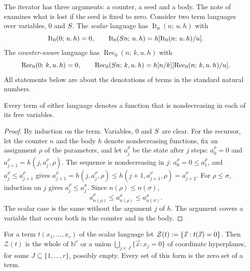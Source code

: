 The iterator has three arguments: a counter, a seed and a body.  The note of
 examines what is lost if the seed is fixed to
zero.  Consider two term languages over variables, $0$ and $S$.  The
\emph{scalar} language has $\operatorname{It}_0(n;\,u.\,h)$ with
\[
 \operatorname{It}_0(0;\,u.\,h)=0,\qquad
 \operatorname{It}_0(S n;\,u.\,h)=h[\operatorname{It}_0(n;\,u.\,h)/u].
\]
The \emph{counter-aware} language has $\operatorname{Rec}_0(n;\,k,u.\,h)$
with
\[
 \operatorname{Rec}_0(0;\,k,u.\,h)=0,\qquad
 \operatorname{Rec}_0(S n;\,k,u.\,h)
  =h[n/k][\operatorname{Rec}_0(n;\,k,u.\,h)/u].
\]
All statements below are about the denotations of terms in the standard
natural numbers.

\begin{theorem}[Monotonicity]
\label{kern:thm:mono}
Every term of either language denotes a function that is nondecreasing in
each of its free variables.
\end{theorem}

\begin{proof}
By induction on the term.  Variables, $0$ and $S$ are clear.  For the
recursor, let the counter $n$ and the body $h$ denote nondecreasing
functions, fix an assignment $\rho$ of the parameters, and let $a^{\rho}_j$
be the state after $j$ steps: $a^{\rho}_0=0$ and
$a^{\rho}_{j+1}=h(j,a^{\rho}_j,\rho)$.  The sequence is nondecreasing in
$j$: $a^{\rho}_0=0\le a^{\rho}_1$, and $a^{\rho}_j\le a^{\rho}_{j+1}$ gives
$a^{\rho}_{j+1}=h(j,a^{\rho}_j,\rho)\le h(j+1,a^{\rho}_{j+1},\rho)
=a^{\rho}_{j+2}$.  For $\rho\le\sigma$, induction on $j$ gives
$a^{\rho}_j\le a^{\sigma}_j$.  Since $n(\rho)\le n(\sigma)$,
\[
 a^{\rho}_{n(\rho)}\le a^{\sigma}_{n(\rho)}\le a^{\sigma}_{n(\sigma)} .
\]
The scalar case is the same without the argument $j$ of $h$.  The argument
covers a variable that occurs both in the counter and in the body.
\end{proof}

\begin{theorem}
\label{kern:thm:zeroprofile}
For a term $t(x_1,\dots,x_r)$ of the scalar language let
$\mathcal{Z}(t)\mathrel{:=}\{\vec x: t(\vec x)=0\}$.  Then $\mathcal{Z}(t)$ is the
whole of $\mathbb{N}^r$ or a union $\bigcup_{j\in J}\{\vec x:x_j=0\}$ of
coordinate hyperplanes, for some $J\subseteq\{1,\dots,r\}$, possibly empty.
Every set of this form is the zero set of a term.
\end{theorem}

